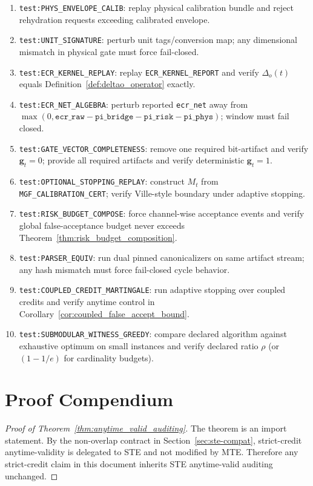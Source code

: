 \documentclass[11pt]{article}
\theoremstyle{definition}
\theoremstyle{plain}
\newcommand{\STE}{\textsf{STE}}
\newcommand{\MTE}{\textsf{MTE}}
\newcommand{\deltao}{\Delta_o}
\begin{document}
\begin{enumerate}[leftmargin=*]
  \item \texttt{test:\allowbreak PHYS\_ENVELOPE\_CALIB}: replay physical calibration bundle and reject rehydration requests exceeding calibrated envelope.
  \item \texttt{test:\allowbreak UNIT\_SIGNATURE}: perturb unit tags/conversion map; any dimensional mismatch in physical gate must force fail-closed.
  \item \texttt{test:\allowbreak ECR\_KERNEL\_REPLAY}: replay \texttt{ECR\_KERNEL\_REPORT} and verify $\deltao(t)$ equals Definition~\ref{def:deltao_operator} exactly.
  \item \texttt{test:\allowbreak ECR\_NET\_ALGEBRA}: perturb reported \texttt{ecr\_net} away from $\max(0,\texttt{ecr\_raw}-\texttt{pi\_bridge}-\texttt{pi\_risk}-\texttt{pi\_phys})$; window must fail closed.
  \item \texttt{test:\allowbreak GATE\_VECTOR\_COMPLETENESS}: remove one required bit-artifact and verify $\mathbf g_t=0$; provide all required artifacts and verify deterministic $\mathbf g_t=1$.
  \item \texttt{test:\allowbreak OPTIONAL\_STOPPING\_REPLAY}: construct $M_t$ from \texttt{MGF\_CALIBRATION\_CERT}; verify Ville-style boundary under adaptive stopping.
  \item \texttt{test:\allowbreak RISK\_BUDGET\_COMPOSE}: force channel-wise acceptance events and verify global false-acceptance budget never exceeds Theorem~\ref{thm:risk_budget_composition}.
  \item \texttt{test:\allowbreak PARSER\_EQUIV}: run dual pinned canonicalizers on same artifact stream; any hash mismatch must force fail-closed cycle behavior.
  \item \texttt{test:\allowbreak COUPLED\_CREDIT\_MARTINGALE}: run adaptive stopping over coupled credits and verify anytime control in Corollary~\ref{cor:coupled_false_accept_bound}.
  \item \texttt{test:\allowbreak SUBMODULAR\_WITNESS\_GREEDY}: compare declared algorithm against exhaustive optimum on small instances and verify declared ratio $\rho$ (or $(1-1/e)$ for cardinality budgets).
\end{enumerate}

\appendix
\section{Proof Compendium}\label{app:proofs}

\begin{proof}[Proof of Theorem~\ref{thm:anytime_valid_auditing}]
The theorem is an import statement.
By the non-overlap contract in Section~\ref{sec:ste-compat}, strict-credit anytime-validity is delegated to \STE{} and not modified by \MTE{}.
Therefore any strict-credit claim in this document inherits \STE{} anytime-valid auditing unchanged.
\end{proof}
\end{document}
